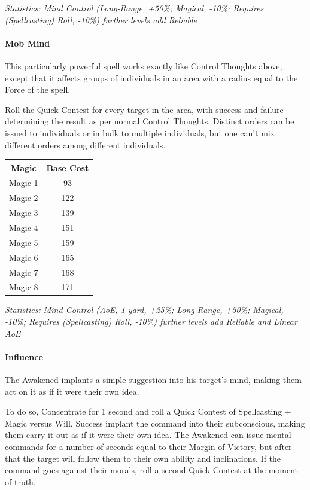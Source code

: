 \begin{multicols}{3}
	\textcolor{OliveGreen}{\textit{Statistics: Mind Control (Long-Range, +50\%; Magical, -10\%; Requires (Spellcasting) Roll, -10\%) further levels add Reliable}}
	
	\paragraph{Mob Mind}
	
	This particularly powerful spell works exactly like Control Thoughts above, except that it affects groups of individuals in an area with a radius equal to the Force of the spell.
	
	Roll the Quick Contest for every target in the area, with success and failure determining the result as per normal Control Thoughts. Distinct orders can be issued to individuals or in bulk to multiple individuals, but one can't mix different orders among different individuals.
	
	\begin{center}
		\begin{tabular}{|c|c|}
			\hline
			Magic & Base Cost \\
			\hline
			\hline
			Magic 1 & 93 \\
			Magic 2 & 122 \\
			Magic 3 & 139 \\
			Magic 4 & 151 \\
			Magic 5 & 159 \\
			Magic 6 & 165 \\
			Magic 7 & 168 \\
			Magic 8 & 171 \\
			\hline
		\end{tabular}
	\end{center}	

	\textcolor{OliveGreen}{\textit{Statistics: Mind Control (AoE, 1 yard, +25\%; Long-Range, +50\%; Magical, -10\%; Requires (Spellcasting) Roll, -10\%) further levels add Reliable and Linear AoE}}
	
	\paragraph{Influence}
	
	The Awakened implants a simple suggestion into his target's mind, making them act on it as if it were their own idea.
	
	To do so, Concentrate for 1 second and roll a Quick Contest of Spellcasting + Magic versus Will. Success implant the command into their subconscious, making them carry it out as if it were their own idea. The Awakened can issue mental commands for a number of seconds equal to their Margin of Victory, but after that the target will follow them to their own ability and inclinations. If the command goes against their morals, roll a second Quick Contest at the moment of truth.
	

\end{multicols}

